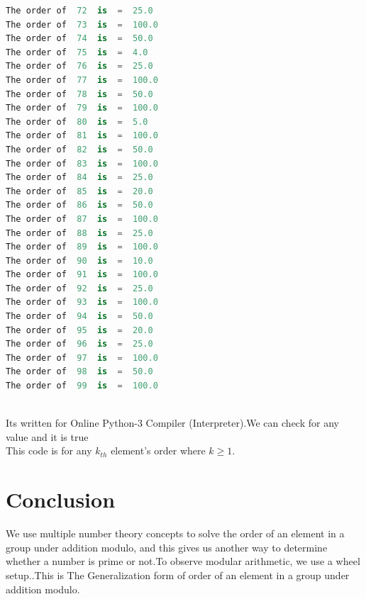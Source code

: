 \documentclass{article}
\begin{document}
\begin{lstlisting}[language=Python, caption=Python output]
The order of  72  is  =  25.0
The order of  73  is  =  100.0
The order of  74  is  =  50.0
The order of  75  is  =  4.0
The order of  76  is  =  25.0
The order of  77  is  =  100.0
The order of  78  is  =  50.0
The order of  79  is  =  100.0
The order of  80  is  =  5.0
The order of  81  is  =  100.0
The order of  82  is  =  50.0
The order of  83  is  =  100.0
The order of  84  is  =  25.0
The order of  85  is  =  20.0
The order of  86  is  =  50.0
The order of  87  is  =  100.0
The order of  88  is  =  25.0
The order of  89  is  =  100.0
The order of  90  is  =  10.0
The order of  91  is  =  100.0
The order of  92  is  =  25.0
The order of  93  is  =  100.0
The order of  94  is  =  50.0
The order of  95  is  =  20.0
The order of  96  is  =  25.0
The order of  97  is  =  100.0
The order of  98  is  =  50.0
The order of  99  is  =  100.0



\end{lstlisting}
Its written for Online Python-3 Compiler (Interpreter).We can check for any value and it is true\\
This code is for any $k_{th}$ element's order where $k\geq1$.


\section{Conclusion}
We use multiple number theory concepts to solve the order of an element in a group under addition modulo, and this gives us another way to determine whether a number is prime or not.To observe modular arithmetic, we use a wheel setup..This is The Generalization form of order of an
element in a group under addition
modulo.





















\end{document}
